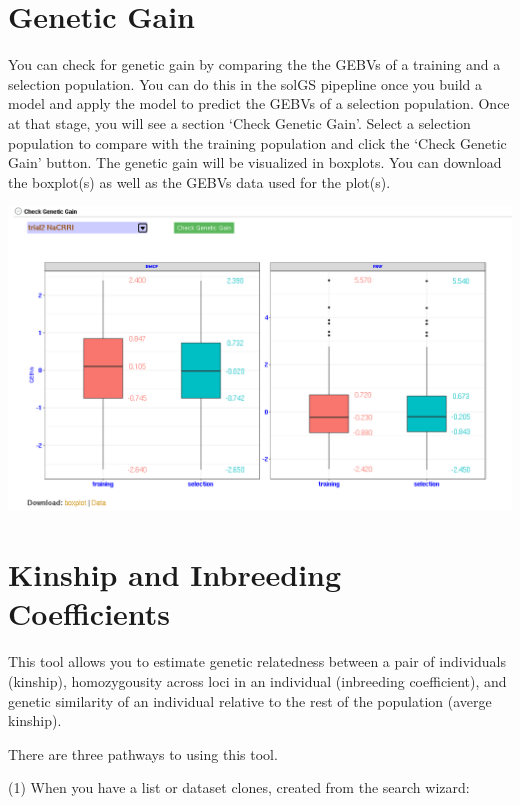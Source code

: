 \documentclass[
  12pt,
]{book}
\begin{document}
\hypertarget{genetic-gain}{%
\section{Genetic Gain}\label{genetic-gain}}

You can check for genetic gain by comparing the the GEBVs of a training and a selection population. You can do this in the solGS pipepline once you build a model and apply the model to predict the GEBVs of a selection population. Once at that stage, you will see a section `Check Genetic Gain'. Select a selection population to compare with the training population and click the `Check Genetic Gain' button. The genetic gain will be visualized in boxplots. You can download the boxplot(s) as well as the GEBVs data used for the plot(s).

\begin{center}\includegraphics[width=0.95\linewidth]{assets/images/genetic-gain} \end{center}

\hypertarget{kinship-and-inbreeding-coefficients}{%
\section{Kinship and Inbreeding Coefficients}\label{kinship-and-inbreeding-coefficients}}

This tool allows you to estimate genetic relatedness between a pair of individuals (kinship), homozygousity across loci in an individual (inbreeding coefficient), and genetic similarity of an individual relative to the rest of the population (averge kinship).

There are three pathways to using this tool.

(1) When you have a list or dataset clones, created from the search wizard:
\end{document}
